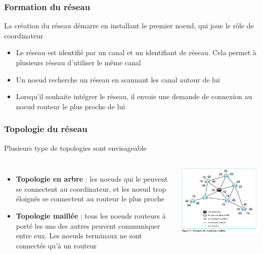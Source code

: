 \documentclass{beamer}
\begin{document}
  \begin{frame}
   \frametitle{Formation du réseau}
   \begin{block}{La création du réseau démarre en installant le premier noeud, qui joue le rôle de coordinateur}
    \begin{itemize}
     \item Le réseau est identifié par un canal et un identifiant de réseau. Cela permet à plusieurs réseau d'utiliser le même canal
     \item Un noeud recherche un réseau en scannant les canal autour de lui
     \item Lorsqu'il souhaite intégrer le réseau, il envoie une demande de connexion au noeud routeur le plus proche de lui 
    \end{itemize}
   \end{block}
  \end{frame}

  
  \begin{frame}
   \frametitle{Topologie du réseau}
   \begin{block}{Plusieurs type de topologies sont envisageable}
   \begin{columns}
    \begin{itemize}
     \item \textbf{Topologie en arbre} : les noeuds qui le peuvent se connectent au coordinateur, et les noeud trop éloignés se connectent au routeur le plus proche
     \item \textbf{Topologie maillée} : tous les noeuds routeurs à porté les uns des autres peuvent communiquer entre eux. Les noeuds terminaux ne sont connectés qu'à un routeur
    \end{itemize}
    \includegraphics[scale=0.25]{Topologie-Maille.png}
   \end{columns}
   \end{block}
  \end{frame}
  
\end{document}
